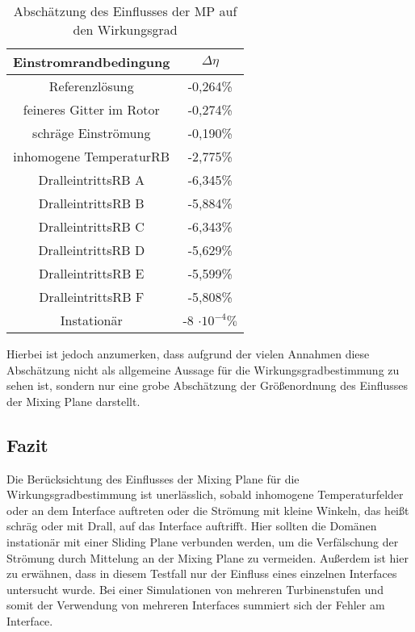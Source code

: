 \begin{table}[htbp]
\centering
\caption{Abschätzung des Einflusses der MP auf den Wirkungsgrad}
\begin{tabular}{ c| c}
Einstromrandbedingung&$\Delta \eta$\\
\toprule
Referenzlösung&-0,264\%\\
feineres Gitter im Rotor&-0,274\%\\
schräge Einströmung&-0,190\% \\
inhomogene TemperaturRB&-2,775\% \\
DralleintrittsRB A&-6,345\% \\
DralleintrittsRB B&-5,884\% \\
DralleintrittsRB C&-6,343\% \\
DralleintrittsRB D&-5,629\% \\
DralleintrittsRB E&-5,599\% \\
DralleintrittsRB F&-5,808\% \\
\midrule
Instationär&-8 $\cdot 10^{-4}\%$ \\
\end{tabular}
\label{tab:kanalwg}
\end{table}
Hierbei ist jedoch anzumerken, dass aufgrund der vielen Annahmen diese Abschätzung nicht als allgemeine Aussage für die Wirkungsgradbestimmung zu sehen ist, sondern nur eine grobe Abschätzung der Größenordnung des Einflusses der Mixing Plane darstellt.

\newpage
\subsection{Fazit}
\label{subsec:fazit}
Die Berücksichtung des Einflusses der Mixing Plane für die Wirkungsgradbestimmung ist unerlässlich, sobald inhomogene Temperaturfelder oder an dem Interface auftreten oder die Strömung mit kleine Winkeln, das heißt schräg oder mit Drall, auf das Interface auftrifft. Hier sollten die Domänen instationär mit einer Sliding Plane verbunden werden, um die Verfälschung der Strömung durch Mittelung an der Mixing Plane zu vermeiden. Außerdem ist hier zu erwähnen, dass in diesem Testfall nur der Einfluss eines einzelnen Interfaces untersucht wurde. Bei einer Simulationen von mehreren Turbinenstufen und somit der Verwendung von mehreren Interfaces summiert sich der Fehler am Interface.



